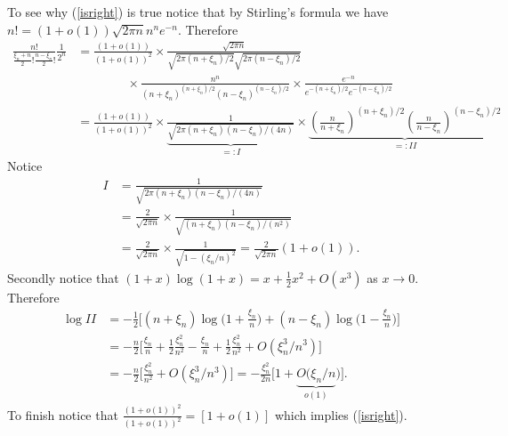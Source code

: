 \documentclass[11pt,letterpaper]{article}
\begin{document}
To see why (\ref{isright}) is true notice that by Stirling's formula we have $n! = (1+o(1)) \sqrt{2\pi n} n^n e^{-n}$. Therefore
\begin{align*}
\frac{n!}{\frac{\xi_n +n}{2}! \frac{n -\xi_n}{2}! }  \frac{1}{2^n}
&= \frac{(1+o(1))}{(1+o(1))^2}\times \frac{\sqrt{2\pi n} }{\sqrt{2\pi (n+\xi_n)/2}\sqrt{2\pi (n-\xi_n)/2}  } \\
&\qquad\qquad\times\frac{n^n}{ (n+\xi_n)^{(n+\xi_n)/2}(n-\xi_n)^{(n-\xi_n)/2}} \times \frac{ e^{-n}}{ e^{-(n+\xi_n)/2} e^{-(n-\xi_n)/2}  } \\
&= \frac{(1+o(1))}{(1+o(1))^2}\times \underbrace{\frac{1 }{\sqrt{2\pi (n+\xi_n) (n-\xi_n)/(4n)}  }}_{=:I}\times\underbrace{\left(\frac{n}{n+\xi_n}\right)^{(n+\xi_n)/2}\left(\frac{n}{n-\xi_n}\right)^{(n-\xi_n)/2}}_{=:I\!I}
\end{align*}
Notice
\begin{align*}
I&=\frac{1 }{\sqrt{2\pi (n+\xi_n) (n-\xi_n)/(4n)}  }\\
 &= \frac{2}{\sqrt{2\pi n}}\times \frac{1}{\sqrt{ (n+\xi_n) (n-\xi_n)/(n^2)}}\\
&= \frac{2}{\sqrt{2\pi n}}\times \frac{1}{\sqrt{1   -(\xi_n/n)^2}}= \frac{2}{\sqrt{2\pi n}} (1+o(1)).
\end{align*}
Secondly notice that $(1+x)\log(1+x)= x +\frac{1}{2}x^2+O(x^3)$ as $x\rightarrow 0$. Therefore
\begin{align*}
\log I\!I&= -\frac{1}{2}\bigl[ (n+\xi_n)\log \bigl(1+\frac{\xi_n}{n}\bigr) +  (n-\xi_n)\log \bigl(1-\frac{\xi_n}{n}\bigr) \bigr] \\
&=-\frac{n}{2}\bigl[\frac{\xi_n}{n} +\frac{1}{2}\frac{\xi_n^2}{n^2} - \frac{\xi_n}{n} +\frac{1}{2}\frac{\xi_n^2}{n^2}+O({\xi^3_n}/{n}^3)  \bigr] \\
&=-\frac{n}{2}\bigl[  \frac{\xi_n^2}{n^2}  +O({\xi^3_n}/{n}^3)  \bigr] = -\frac{\xi_n^2}{2n}\bigl[ 1  +\underbrace{O({\xi_n}/{n}}_{o(1)})  \bigr].
\end{align*}
To finish notice that   $\frac{(1+o(1))^2}{(1+o(1))^2} = [1+o(1)]$ which implies (\ref{isright}).
\end{document}
